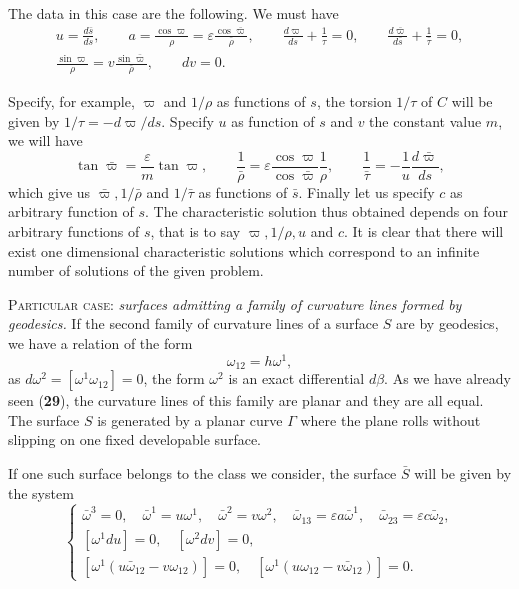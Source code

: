 \documentclass[leqno,11pt]{book}
\numberwithin{equation}{chapter}
\theoremstyle{shape1}
\theoremstyle{shape0}
\theoremstyle{shape2}
\theoremstyle{definition}
\begin{document}
The data in this case are the following. We must have
\begin{gather*}
  u=\frac{d\bar s}{ds},\qquad a=\frac{\cos\varpi}{\rho}=\varepsilon\frac{\cos\bar\varpi}{\bar\rho},\qquad\frac{d\varpi}{ds}+\frac{1}{\tau}=0,\qquad\frac{d\bar\varpi}{d\bar s}+\frac{1}{\bar\tau}=0,\\
  \frac{\sin\varpi}{\rho}=v\frac{\sin\bar\varpi}{\bar\rho},\qquad dv=0.
\end{gather*}

Specify, for example, $\varpi$ and $1/\rho$ as functions of $s$, the torsion $1/\tau$ of $C$ will be given by $1/\tau=-d\varpi/ds$. Specify $u$ as function of $s$ and $v$ the constant value $m$, we will have
\[
\tan\bar\varpi=\frac{\varepsilon}{m}\tan\varpi,\qquad\frac{1}{\bar\rho}=\varepsilon\frac{\cos\varpi}{\cos\bar\varpi}\frac{1}{\rho},\qquad\frac{1}{\bar\tau}=-\frac{1}{u}\frac{d\bar\varpi}{ds},
\]
which give us $\bar\varpi, 1/\bar\rho$ and $1/\bar\tau$ as functions of $\bar s$. Finally let us specify $c$ as arbitrary function of $s$. The characteristic solution thus obtained depends on four arbitrary functions of $s$, that is to say $\varpi,1/\rho,u$ and $c$. It is clear that there will exist one dimensional characteristic solutions which correspond to an infinite number of solutions of the given problem.


\vspace{12pt}\fsec \textsc{Particular case}: \emph{surfaces admitting a family of curvature lines formed by geodesics.} If the second family of curvature lines of a surface $S$ are by geodesics, we have a relation of the form
\begin{equation}
  \label{eq:7.IX.5}\tag{IX, 5}
  \omega_{12}=h\omega^{1},
\end{equation}
as $d\omega^{2}=[\omega^{1}\omega_{12}]=0$, the form $\omega^{2}$ is an exact differential $d\beta$. As we have already seen (\textsection\textbf{29}), the curvature lines of this family are planar and they are all equal. The surface $S$ is generated by a planar curve $\Gamma$ where the plane rolls without slipping on one fixed developable surface.

If one such surface belongs to the class we consider, the surface $\bar S$ will be given by the system
\begin{equation}
  \label{eq:7.IX.6}\tag{IX, 6}
  \left\{
    \begin{gathered}{}
      \bar\omega^{3}=0,\quad\bar\omega^{1}=u\omega^{1},\quad\bar\omega^{2}=v\omega^{2},\quad\bar\omega_{13}=\varepsilon a\bar\omega^{1},\quad\bar\omega_{23}=\varepsilon c\bar\omega_{2},\\
      [\omega^{1}du]=0,\quad[\omega^{2}dv]=0,\\
      [\omega^{1}(u\bar\omega_{12}-v\omega_{12})]=0,\quad[\omega^{1}(u\omega_{12}-v\bar\omega_{12})]=0.
    \end{gathered}
  \right.
\end{equation}
\end{document}
